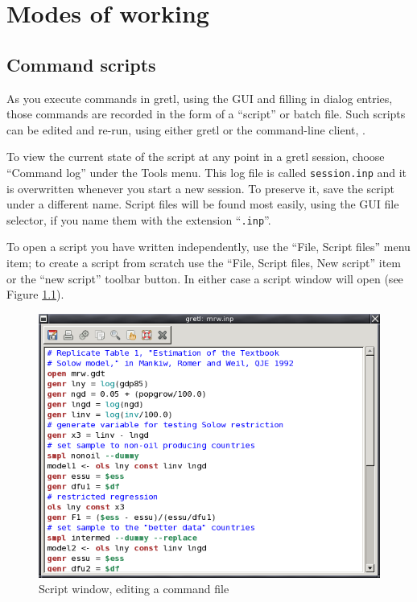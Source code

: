 \chapter{Modes of working}
\label{chap:modes}

\section{Command scripts}
\label{scripts}

As you execute commands in gretl, using the GUI and filling in
dialog entries, those commands are recorded in the form of a
``script'' or batch file.  Such scripts can be edited and re-run,
using either gretl or the command-line client, .

To view the current state of the script at any point in a gretl
session, choose ``Command log'' under the Tools menu. This log
file is called \verb+session.inp+ and it is overwritten whenever you
start a new session.  To preserve it, save the script under a
different name.  Script files will be found most easily, using the GUI
file selector, if you name them with the extension ``\verb+.inp+''.

To open a script you have written independently, use the ``File,
Script files'' menu item; to create a script from scratch use the
``File, Script files, New script'' item or the ``new script'' toolbar
button.  In either case a script window will open (see Figure
\ref{fig-scriptwin}).

\begin{figure}[htbp]
  \begin{center}
    \includegraphics[scale=0.5]{figures/scriptwin}
  \end{center}
  \caption{Script window, editing a command file}
  \label{fig-scriptwin}
\end{figure}

